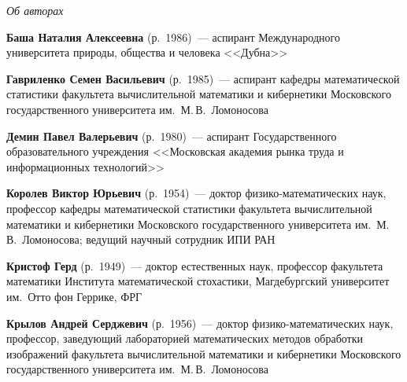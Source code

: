 \begin{center}\LARGE
\textit{Об авторах}
\end{center}

\thispagestyle{empty}



\vspace*{48pt}


\begin{multicols}{2}

\noindent
\textbf{Баша Наталия Алексеевна} (р.\ 1986)~--- 
аспирант Международного университета природы, общества и человека <<Дубна>>

\vspace*{3pt}

\noindent
\textbf{Гавриленко Семен Васильевич} (р.\ 1985)~--- аспирант кафедры
математической статистики факультета вычислительной математики и
кибернетики Московского государственного университета им.\ 
М.\,В.~Ломоносова


\vspace*{3pt} 

\noindent
\textbf{Демин Павел Валерьевич} (р.\ 1980)~--- аспирант Государственного образовательного учреждения <<Московская
академия рынка труда и информационных технологий>>


\vspace*{3pt}

\noindent
\textbf{Королев Виктор Юрьевич} (р.\ 1954)~--- доктор физико-математических наук, 
профессор кафедры математической статистики факультета вычислительной математики и кибернетики 
Московского государственного университета им.~М.\,В.~Ломоносова;
ведущий научный сотрудник ИПИ РАН

\vspace*{3pt}

\noindent
\textbf{Кристоф Герд} (р.\ 1949)~--- доктор естественных наук, 
профессор факультета математики Института математической стохастики, 
Магдебургский университет им.\ Отто фон Геррике, ФРГ

\vspace*{3pt}

\noindent
\textbf{Крылов Андрей Серджевич} (р.\ 1956)~--- 
доктор фи\-зи\-ко-ма\-те\-ма\-ти\-че\-ских наук, профессор, заведующий 
лабораторией математических методов обработки изображений 
факультета вычислительной математики и кибернетики Московского 
государственного университета им.\ М.\,В.~Ломоносова


\end{multicols}
